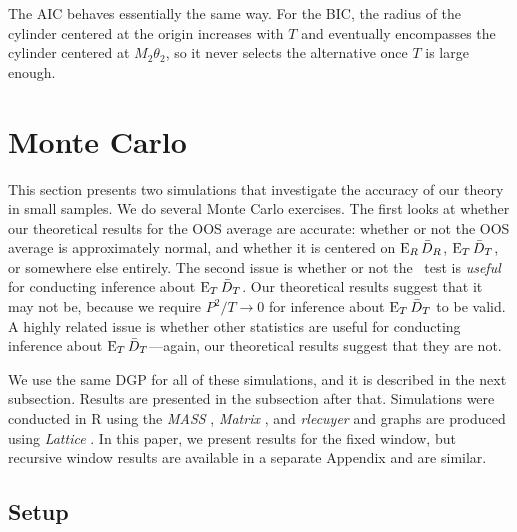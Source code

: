 \documentclass[12pt,draft]{article}
\begin{document}
The AIC behaves essentially the same way. For the BIC, the radius of
the cylinder centered at the origin increases with $T$ and eventually
encompasses the cylinder centered at $M_2 \theta_2$, so it never
selects the alternative once $T$ is large enough.
\section{Monte Carlo}
\label{sec:mc}

This section presents two simulations that investigate the accuracy of
our theory in small samples.
We do several Monte Carlo exercises. The first looks at whether our
theoretical results for the OOS average are accurate: whether or not
the OOS average is approximately normal, and whether it is centered on
$\operatorname{E}_R \bar{D}_{R}$, $\operatorname{E}_T \bar{D}_{T}$, or somewhere else entirely. The second
issue is whether or not the \oost\ test is \emph{useful} for
conducting inference about $\operatorname{E}_T \bar{D}_{T}$. Our theoretical results
suggest that it may not be, because we require $P^2/T \to 0$ for
inference about $\operatorname{E}_T \bar{D}_{T}$ to be valid. A highly related issue is
whether other statistics are useful for conducting inference about
$\operatorname{E}_T \bar{D}_{T}$---again, our theoretical results suggest that they are
not.

We use the same DGP for all of these simulations, and it is described
in the next subsection. Results are presented in the subsection after
that. Simulations were conducted in R \citep{Rde:10} using the
\emph{MASS} \citep{VeR:02}, \emph{Matrix} \citep{BM:13}, and
\emph{rlecuyer} \citep{SR:12} and graphs are produced using
\emph{Lattice} \citep{Sar:10}. In this paper, we present results for
the fixed window, but recursive window results are available in a
separate Appendix and are similar.

\subsection{Setup}
\label{sec:simulation-design}
\end{document}
